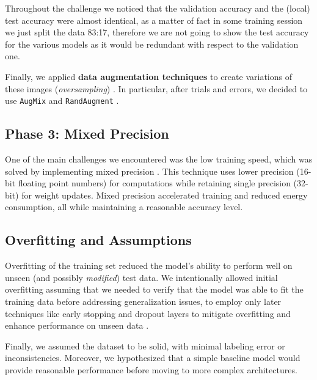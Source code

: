 \documentclass[11pt]{article}
\begin{document}
\begin{multicols*}{2}
        Throughout the challenge we noticed that the validation accuracy and the (local) test accuracy were almost identical, as a matter of fact in some training session we just split the data 83:17, therefore we are not going to show the test accuracy for the various models as it would be redundant with respect to the validation one.

        Finally, we applied \textbf{data augmentation techniques} to create variations of these images (\textit{oversampling}) \cite{oversampling}. In particular, after trials and errors, we decided to use \texttt{AugMix} and \texttt{RandAugment} \cite{aug}.

        

        \subsection{Phase 3: Mixed Precision}

        One of the main challenges we encountered was the low training speed, which was solved by implementing mixed precision \cite{mixed-precision}. This technique uses lower precision (16-bit floating point numbers) for computations while retaining single precision (32-bit) for weight updates. Mixed precision accelerated training and reduced energy consumption, all while maintaining a reasonable accuracy level. 

        \subsection{Overfitting and Assumptions}
        
        Overfitting of the training set reduced the model's ability to perform well on unseen (and possibly \textit{modified}) test data. We intentionally allowed initial overfitting assuming that we needed to verify that the model was able to fit the training data before addressing generalization issues, to employ only later techniques like early stopping and dropout layers to mitigate overfitting and enhance performance on unseen data \cite{overfitting}.

        Finally, we assumed the dataset to be solid, with minimal labeling error or inconsistencies. Moreover, we hypothesized that a simple baseline model would provide reasonable performance before moving to more complex architectures. 



\end{multicols*}
\end{document}
